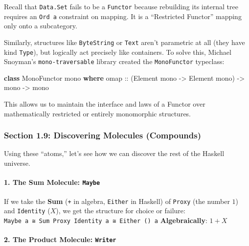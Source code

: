 \documentclass[
]{article}
\newenvironment{Shaded}{}{}
\newcommand{\DataTypeTok}[1]{\textcolor[rgb]{0.56,0.13,0.00}{#1}}
\newcommand{\KeywordTok}[1]{\textcolor[rgb]{0.00,0.44,0.13}{\textbf{#1}}}
\newcommand{\NormalTok}[1]{#1}
\newcommand{\OtherTok}[1]{\textcolor[rgb]{0.00,0.44,0.13}{#1}}
\begin{document}
Recall that \texttt{Data.Set} fails to be a \texttt{Functor} because
rebuilding its internal tree requires an \texttt{Ord\ a} constraint on
mapping. It is a ``Restricted Functor'' mapping only onto a subcategory.

Similarly, structures like \texttt{ByteString} or \texttt{Text} aren't
parametric at all (they have kind \texttt{Type}), but logically act
precisely like containers. To solve this, Michael Snoyman's
\texttt{mono-traversable} library created the \texttt{MonoFunctor}
typeclass:

\begin{Shaded}
\begin{Highlighting}[]
\KeywordTok{class} \DataTypeTok{MonoFunctor}\NormalTok{ mono }\KeywordTok{where}
\OtherTok{    omap ::}\NormalTok{ (}\DataTypeTok{Element}\NormalTok{ mono }\OtherTok{{-}\textgreater{}} \DataTypeTok{Element}\NormalTok{ mono) }\OtherTok{{-}\textgreater{}}\NormalTok{ mono }\OtherTok{{-}\textgreater{}}\NormalTok{ mono}
\end{Highlighting}
\end{Shaded}

This allows us to maintain the interface and laws of a Functor over
mathematically restricted or entirely monomorphic structures.

\subsubsection{Section 1.9: Discovering Molecules
(Compounds)}\label{section-1.9-discovering-molecules-compounds}

Using these ``atoms,'' let's see how we can discover the rest of the
Haskell universe.

\paragraph{\texorpdfstring{1. The Sum Molecule:
\texttt{Maybe}}{1. The Sum Molecule: Maybe}}\label{the-sum-molecule-maybe}

If we take the \textbf{Sum} (\texttt{+} in algebra, \texttt{Either} in
Haskell) of \texttt{Proxy} (the number \(1\)) and \texttt{Identity}
(\(X\)), we get the structure for choice or failure:
\texttt{Maybe\ a\ ≅\ Sum\ Proxy\ Identity\ a\ ≅\ Either\ ()\ a}
\textbf{Algebraically}: \(1 + X\)

\paragraph{\texorpdfstring{2. The Product Molecule:
\texttt{Writer}}{2. The Product Molecule: Writer}}\label{the-product-molecule-writer}
\end{document}
